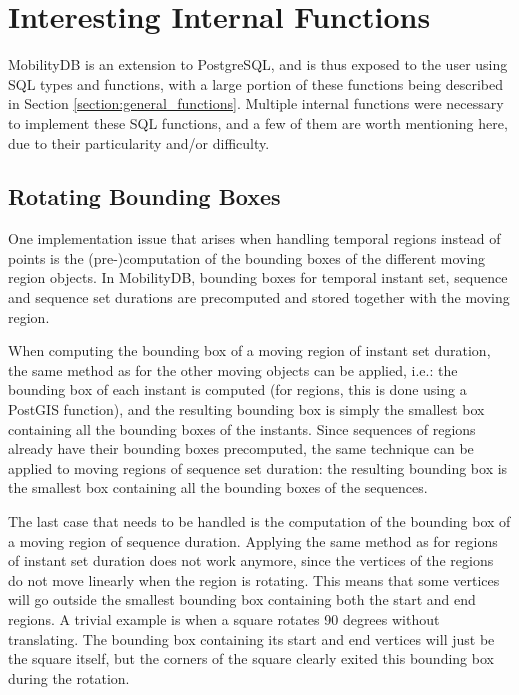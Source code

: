 
\newpage

\section{Interesting Internal Functions}
\label{section:internal_functions}

MobilityDB is an extension to PostgreSQL, and is thus exposed to the user using SQL types and functions, with a large portion of these functions being described in Section \ref{section:general_functions}. Multiple internal functions were necessary to implement these SQL functions, and a few of them are worth mentioning here, due to their particularity and/or difficulty.

\subsection{Rotating Bounding Boxes}
\label{section:bbox}

One implementation issue that arises when handling temporal regions instead of points is the (pre-)computation of the bounding boxes of the different moving region objects. In MobilityDB, bounding boxes for temporal instant set, sequence and sequence set durations are precomputed and stored together with the moving region.
    
When computing the bounding box of a moving region of instant set duration, the same method as for the other moving objects can be applied, i.e.: the bounding box of each instant is computed (for regions, this is done using a PostGIS function), and the resulting bounding box is simply the smallest box containing all the bounding boxes of the instants. Since sequences of regions already have their bounding boxes precomputed, the same technique can be applied to moving regions of sequence set duration: the resulting bounding box is the smallest box containing all the bounding boxes of the sequences.


The last case that needs to be handled is the computation of the bounding box of a moving region of sequence duration. Applying the same method as for regions of instant set duration does not work anymore, since the vertices of the regions do not move linearly when the region is rotating. This means that some vertices will go outside the smallest bounding box containing both the start and end regions. A trivial example is when a square rotates 90 degrees without translating. The bounding box containing its start and end vertices will just be the square itself, but the corners of the square clearly exited this bounding box during the rotation. 

